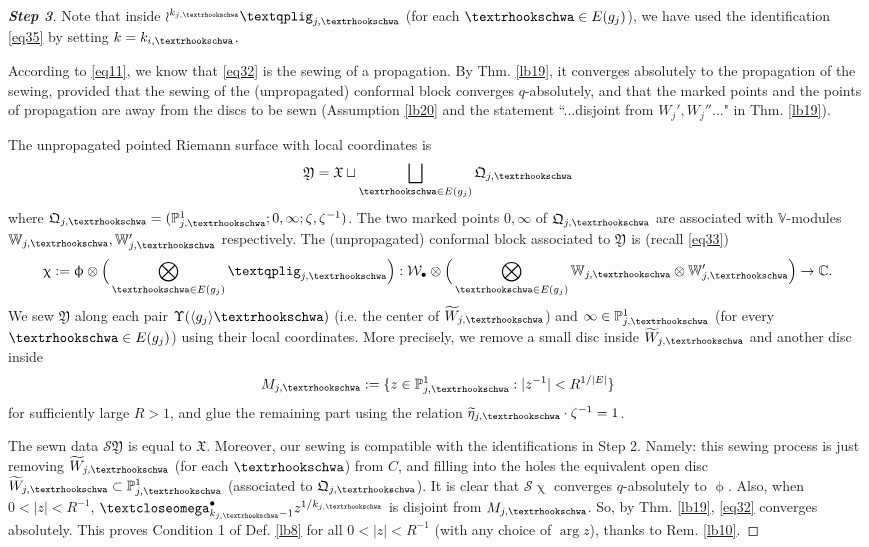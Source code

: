 \documentclass[11pt,b5paper,notitlepage]{article}
\theoremstyle{definition}
\theoremstyle{plain}
\newcommand{\fk}{\mathfrak}
\newcommand{\mc}{\mathcal}
\newcommand{\wtd}{\widetilde}
\newcommand{\bk}[1]{\langle {#1}\rangle}
\newcommand{\scr}{\mathscr}
\newcommand{\blt}{\bullet}
\newcommand{\Vbb}{\mathbb V}
\newcommand{\Wbb}{\mathbb W}
\newcommand{\Cbb}{\mathbb C}
\newcommand{\Pbb}{\mathbb P}
\newcommand{\tipaomega}{\text{\textcloseomega}}
\newcommand{\tipae}{\text{\textrhookschwa}}
\newcommand{\tipxphi}{\text{\textqplig}}
\numberwithin{equation}{subsection}
\begin{document}
\begin{proof}[\textbf{Step 3}]
Note that inside $\wr^{{k_{j,\tipae}}}\tipxphi_{j,\tipae}$ (for each $\tipae\in E(g_j)$), we have used the identification \eqref{eq35} by setting $k=k_{i,\tipae}$. 

According to \eqref{eq11}, we know that \eqref{eq32} is the sewing of a propagation. By Thm. \ref{lb19}, it converges absolutely to the propagation of the sewing, provided that the sewing of the (unpropagated) conformal block converges $q$-absolutely, and that the marked points and the points of propagation are away from the discs to be sewn (Assumption \ref{lb20} and the statement ``...disjoint from $W_j',W_j''$..." in Thm. \ref{lb19}). 

The unpropagated pointed Riemann surface with local coordinates is 
\begin{align*}
\fk Y=\fk X\sqcup\bigsqcup_{\tipae\in E(g_j)}\fk Q_{j,\tipae}	
\end{align*}
where $\fk Q_{j,\tipae}=(\Pbb^1_{j,\tipae};0,\infty;\zeta,\zeta^{-1})$. The two marked points $0,\infty$ of $\fk Q_{j,\tipae}$ are associated with $\Vbb$-modules $\Wbb_{j,\tipae},\Wbb_{j,\tipae}'$ respectively. The (unpropagated) conformal block associated to $\fk Y$ is (recall \eqref{eq33})
\begin{align*}
\upchi:=\upphi\otimes \Big(\bigotimes_{\tipae\in E(g_j)}\tipxphi_{j,\tipae}\Big):\mc W_\blt\otimes	\Big(\bigotimes_{\tipae\in E(g_j)}\Wbb_{j,\tipae}\otimes\Wbb_{j,\tipae}'\Big)\rightarrow\Cbb.
\end{align*}
We sew $\fk Y$ along each pair $\Upsilon(\bk{g_j}\tipae)$ (i.e. the center of $\wtd W_{j,\tipae}$) and $\infty\in\Pbb^1_{j,\tipae}$  (for every $\tipae\in E(g_j)$) using their local coordinates. More precisely, we remove a small disc inside $\wtd W_{j,\tipae}$ and another disc inside
\begin{align*}
M_{j,\tipae}:=\{z\in\Pbb^1_{j,\tipae}:|z^{-1}|<R^{1/|E|}\}
\end{align*}
for sufficiently large $R>1$, and glue the remaining part using the relation $\wtd\eta_{j,\tipae}\cdot \zeta^{-1}=1$. 

The sewn data  $\scr S\fk Y$ is equal to $\fk X$.   Moreover, our sewing is compatible with the identifications in Step 2. Namely: this sewing process is just removing $\wtd W_{j,\tipae}$ (for each $\tipae$) from $C$, and filling into the holes  the equivalent open disc $\wtd W_{j,\tipae}\subset\Pbb^1_{j,\tipae}$ (associated to $\fk Q_{j,\tipae}$). It is clear that $\scr S\upchi$ converges $q$-absolutely to $\upphi$. Also, when $0<|z|<R^{-1}$, $\tipaomega_{k_{j,\tipae}-1}^\blt z^{1/{k_{j,\tipae}}}$ is disjoint from $M_{j,\tipae}$. So, by Thm. \ref{lb19}, \eqref{eq32} converges absolutely. This proves Condition 1 of Def. \ref{lb8} for all $0<|z|<R^{-1}$ (with any choice of $\arg z$), thanks to Rem. \ref{lb10}.
\end{proof}
\end{document}

